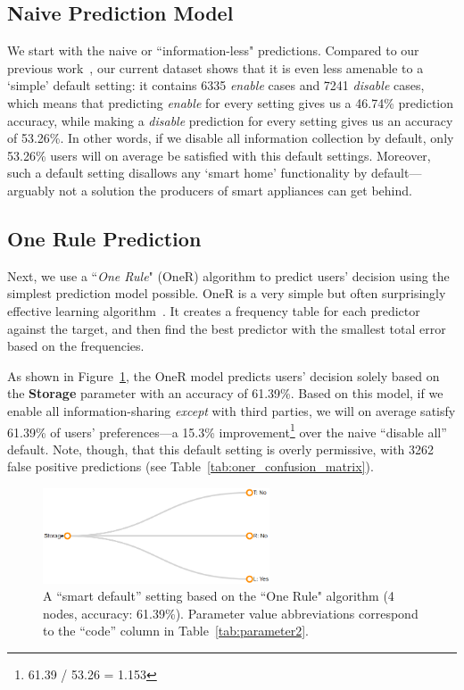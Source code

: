 \subsection{Naive Prediction Model}
We start with the naive or ``information-less" predictions. Compared to our previous work~\cite{bahiratiui2018}, our current dataset shows that it is even less amenable to a `simple' default setting: it contains 6335 \emph{enable} cases and 7241 \emph{disable} cases, which means that predicting \textit{enable} for every setting gives us a 46.74\% prediction accuracy, while making a \textit{disable} prediction for every setting gives us an accuracy of 53.26\%. In other words, if we disable all information collection by default, only 53.26\% users will on average be satisfied with this default settings. Moreover, such a default setting disallows any `smart home' functionality by default---arguably not a solution the producers of smart appliances can get behind.

\subsection{One Rule Prediction}
Next, we use a ``\textit{One Rule}" (OneR) algorithm to predict users' decision using the simplest prediction model possible. OneR is a very simple but often surprisingly effective learning algorithm~\cite{Holte1993}. It creates a frequency table for each predictor against the target, and then find the best predictor with the smallest total error based on the frequencies.

As shown in Figure~\ref{fig:oneR}, the OneR model predicts users' decision solely based on the \textbf{Storage} parameter with an accuracy of 61.39\%.  Based on this model, if we enable all information-sharing \emph{except} with third parties, we will on average satisfy 61.39\% of users' preferences---a 15.3\% improvement\footnote{61.39 / 53.26 = 1.153} over the naive ``disable all'' default. Note, though, that this default setting is overly permissive, with 3262 false positive predictions (see Table~\ref{tab:oner_confusion_matrix}).

\begin{figure}
	\centering
	\includegraphics[width=0.6\textwidth]{figures/oneR.png}
	\caption{A ``smart default'' setting based on the ``One Rule" algorithm (4 nodes, accuracy: 61.39\%). Parameter value abbreviations correspond to the ``code'' column in Table~\ref{tab:parameter2}.}
	\label{fig:oneR}
\end{figure}


